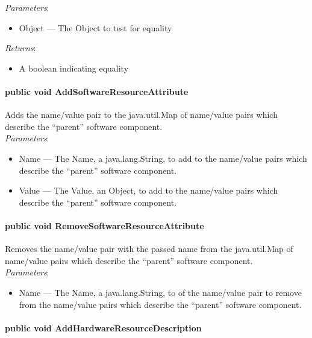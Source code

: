 \documentclass[$Date: 2003/06/26 19:29:31 $]{glabarticle}
\begin{document}
 
\textit{Parameters}:
\begin{itemize}
\item[] Object --- The Object to test for equality 
\end{itemize}

\textit{Returns}:
\begin{itemize}
\item[] A boolean indicating equality
\end{itemize}
 
\paragraph{public void AddSoftwareResourceAttribute}

Adds the name/value pair to the java.util.Map of name/value pairs which
describe the ``parent'' software component. \\

\textit{Parameters}:
\begin{itemize}
\item[] Name --- The Name, a java.lang.String, to add to the  name/value pairs which describe the ``parent'' 
software component.
\item[] Value --- The Value, an Object, to add to the  name/value pairs which describe the ``parent'' 
software component.
\end{itemize}

\paragraph{public void RemoveSoftwareResourceAttribute}

Removes the name/value pair with the passed name from the java.util.Map of
name/value pairs which describe the ``parent'' software component. \\

\textit{Parameters}:
\begin{itemize}
\item[] Name --- The Name, a java.lang.String, to of the name/value pair to remove from the  name/value pairs 
which describe the ``parent'' software component.
\end{itemize}

\paragraph{public void AddHardwareResourceDescription}
\end{document}
